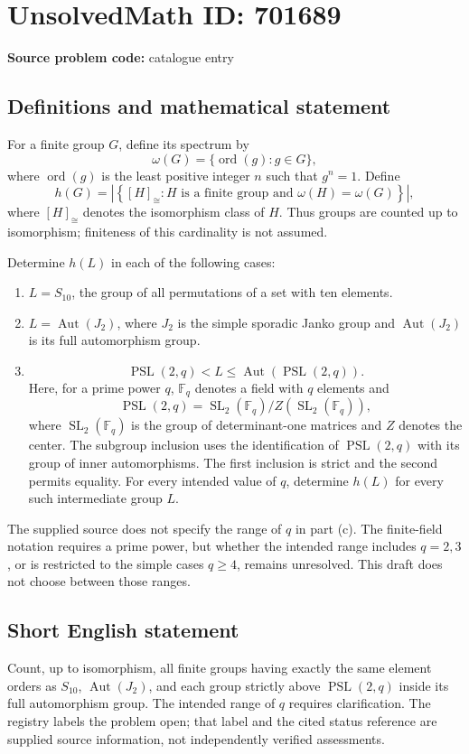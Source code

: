 \documentclass[11pt]{article}
\newcommand{\F}{\mathbb{F}}
\begin{document}
\section*{UnsolvedMath ID: 701689}
\textbf{Source problem code:} catalogue entry
\subsection{Definitions and mathematical statement}
For a finite group \(G\), define its spectrum by
\[
\omega(G)=\{\operatorname{ord}(g):g\in G\},
\]
where \(\operatorname{ord}(g)\) is the least positive integer \(n\) such that \(g^n=1\). Define
\[
h(G)=\left|\left\{[H]_{\cong}: H\text{ is a finite group and }\omega(H)=\omega(G)\right\}\right|,
\]
where \([H]_{\cong}\) denotes the isomorphism class of \(H\). Thus groups are counted up to isomorphism; finiteness of this cardinality is not assumed.

Determine \(h(L)\) in each of the following cases:
\begin{enumerate}
\item[(a)] \(L=S_{10}\), the group of all permutations of a set with ten elements.
\item[(b)] \(L=\operatorname{Aut}(J_2)\), where \(J_2\) is the simple sporadic Janko group and \(\operatorname{Aut}(J_2)\) is its full automorphism group.
\item[(c)]
\[
\operatorname{PSL}(2,q)<L\leq\operatorname{Aut}(\operatorname{PSL}(2,q)).
\]
Here, for a prime power \(q\), \(\F_q\) denotes a field with \(q\) elements and
\[
\operatorname{PSL}(2,q)=\operatorname{SL}_2(\F_q)/Z(\operatorname{SL}_2(\F_q)),
\]
where \(\operatorname{SL}_2(\F_q)\) is the group of determinant-one matrices and \(Z\) denotes the center. The subgroup inclusion uses the identification of \(\operatorname{PSL}(2,q)\) with its group of inner automorphisms. The first inclusion is strict and the second permits equality. For every intended value of \(q\), determine \(h(L)\) for every such intermediate group \(L\).
\end{enumerate}
The supplied source does not specify the range of \(q\) in part (c). The finite-field notation requires a prime power, but whether the intended range includes \(q=2,3\), or is restricted to the simple cases \(q\geq4\), remains unresolved. This draft does not choose between those ranges.
\subsection{Short English statement}
Count, up to isomorphism, all finite groups having exactly the same element orders as \(S_{10}\), \(\operatorname{Aut}(J_2)\), and each group strictly above \(\operatorname{PSL}(2,q)\) inside its full automorphism group. The intended range of \(q\) requires clarification. The registry labels the problem open; that label and the cited status reference are supplied source information, not independently verified assessments.
\end{document}
